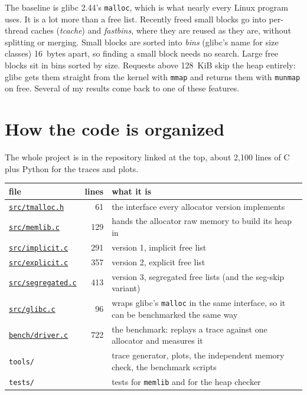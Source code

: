 \documentclass[11pt,letterpaper]{article}
\newcommand{\repo}{https://github.com/yazeed1s/tmalloc}
\newcommand{\src}[1]{\href{\repo/blob/main/#1}{\texttt{#1}}}
\begin{document}
The baseline is glibc 2.44's \texttt{malloc}, which is what nearly every Linux program uses. It is a lot more than a free list. Recently freed small blocks go into per-thread caches (\emph{tcache}) and \emph{fastbins}, where they are reused as they are, without splitting or merging. Small blocks are sorted into \emph{bins} (glibc's name for size classes) 16~bytes apart, so finding a small block needs no search. Large free blocks sit in bins sorted by size. Requests above 128~KiB skip the heap entirely: glibc gets them straight from the kernel with \texttt{mmap} and returns them with \texttt{munmap} on free. Several of my results come back to one of these features.

\section{How the code is organized}
\label{sec:code}

The whole project is in the repository linked at the top, about 2,100 lines of C plus Python for the traces and plots.

\begin{center}
\footnotesize
\begin{tabularx}{\textwidth}{@{}l r X@{}}
\toprule
file & lines & what it is \\
\midrule
\src{src/tmalloc.h} & 61 & the interface every allocator version implements \\
\src{src/memlib.c} & 129 & hands the allocator raw memory to build its heap in \\
\src{src/implicit.c} & 291 & version 1, implicit free list \\
\src{src/explicit.c} & 357 & version 2, explicit free list \\
\src{src/segregated.c} & 413 & version 3, segregated free lists (and the seg-skip variant) \\
\src{src/glibc.c} & 96 & wraps glibc's \texttt{malloc} in the same interface, so it can be benchmarked the same way \\
\src{bench/driver.c} & 722 & the benchmark: replays a trace against one allocator and measures it \\
\texttt{tools/} & & trace generator, plots, the independent memory check, the benchmark scripts \\
\texttt{tests/} & & tests for \texttt{memlib} and for the heap checker \\
\bottomrule
\end{tabularx}
\end{center}
\end{document}
